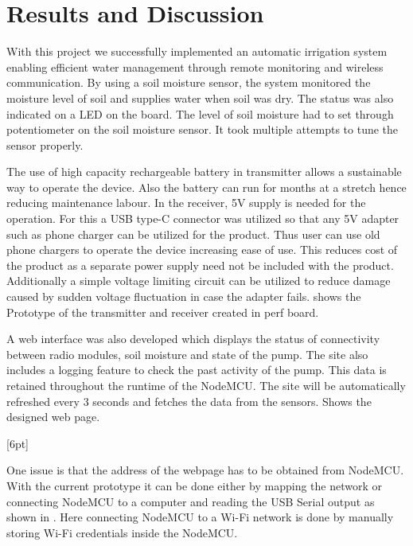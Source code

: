 \newpage
\chapter{Results and Discussion}

With this project we successfully implemented an automatic irrigation system enabling efficient water management through remote monitoring and wireless communication. By using a soil moisture sensor, the system monitored the moisture level of soil and supplies water when soil was dry. The status was also indicated on a LED on the board. The level of soil moisture had to set through potentiometer on the soil moisture sensor. It took multiple attempts to tune the sensor properly.

The use of high capacity rechargeable battery in transmitter allows a sustainable way to operate the device. Also the battery can run for months at a stretch hence reducing maintenance labour. In the receiver, 5V supply is needed for the operation. For this a USB type-C connector was utilized so that any 5V adapter such as phone charger can be utilized for the product. Thus user can use old phone chargers to operate the device increasing ease of use. This reduces cost of the product as a separate power supply need not be included with the product. Additionally a simple voltage limiting circuit can be utilized to reduce damage caused by sudden voltage fluctuation in case the adapter fails.  shows the Prototype of the transmitter and receiver created in perf board.

\vspace*{.8cm}
\vspace*{.8cm}

A web interface was also developed which displays the status of connectivity between radio modules, soil moisture and state of the pump. The site also includes a logging feature to check the past activity of the pump. This data is retained throughout the runtime of the NodeMCU. The site will be automatically refreshed every 3 seconds and fetches the data from the sensors.  Shows the designed web page.

\vspace*{20pt}
[6pt]

\vspace*{12pt}
One issue is that the address of the webpage has to be obtained from NodeMCU. With the current prototype it can be done either by mapping the network or connecting NodeMCU to a computer and reading the USB Serial output as shown in . Here connecting NodeMCU to a Wi-Fi network is done by manually storing Wi-Fi credentials inside the NodeMCU. 
\vspace*{20pt}

